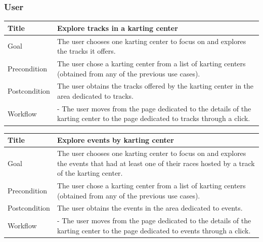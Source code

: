 \documentclass{beamer}
\begin{document}

\begin{frame}
    \frametitle{User}
    \begin{table}
        \tiny
        \begin{tabular}{|p{2cm}|p{6cm}|}
        \hline
        Title & \textbf{Explore tracks in a karting center} \\
        \hline
        Goal & The user chooses one karting center to focus on and explores the tracks it offers. \\
        \hline
        Precondition & The user chose a karting center from a list of karting centers (obtained from any of the previous use cases).\\
        \hline
        Postcondition & The user obtains the tracks offered by the karting center in the area dedicated to tracks. \\
        \hline
        Workflow &
        - The user moves from the page dedicated to the details of the karting center to the
        page dedicated to tracks through a click. \\
        \hline
        \end{tabular}
\end{table}

\begin{table}
    \tiny
    \begin{tabular}{|p{2cm}|p{6cm}|}
    \hline
    Title & \textbf{Explore events by karting center} \\
    \hline
    Goal & The user chooses one karting center to focus on and explores the events that had at least one 
    of their races hosted by a track of the karting center. \\
    \hline
    Precondition & The user chose a karting center from a list of karting centers (obtained from any of the previous use cases).\\
    \hline
    Postcondition & The user obtains the events in the area dedicated to events. \\
    \hline
    Workflow &
    - The user moves from the page dedicated to the details of the karting center to the
    page dedicated to events through a click. \\
    \hline
    \end{tabular}
\end{table}
\end{frame}

\end{document}
